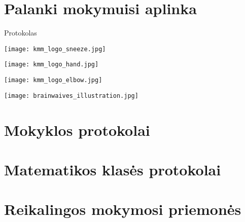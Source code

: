 \KMMTitlePage


\section{Palanki mokymuisi aplinka}


\begin{frame}{Protokolas}{\secname}
\begin{ApBox}
\end{ApBox}
\end{frame}


\begin{frame}
\centering
\texttt{[image: kmm\_logo\_sneeze.jpg]}
\end{frame}


\begin{frame}
\centering
\texttt{[image: kmm\_logo\_hand.jpg]}
\end{frame}


\begin{frame}
\centering
\texttt{[image: kmm\_logo\_elbow.jpg]}
\end{frame}


\begin{frame}
\centering
\texttt{[image: brainwaives\_illustration.jpg]}
\end{frame}


\section{Mokyklos protokolai}


\section{Matematikos klasės protokolai}


\section{Reikalingos mokymosi priemonės}


